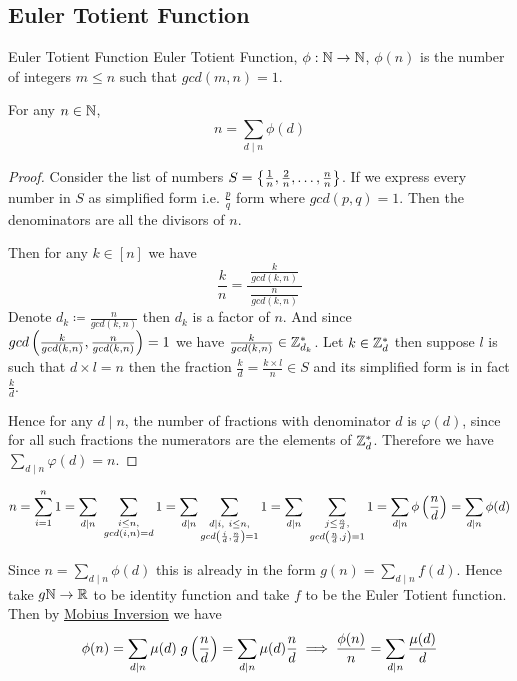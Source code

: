 \documentclass[twoside]{article}
\begin{document}
\subsection{Euler Totient Function}
\begin{Definition}{Euler Totient Function}{}
	Euler Totient Function, $\phi:\mathbb{N}\to\mathbb{N}$, $\phi(n)$ is the number of integers $m\leq n$ such that $gcd(m,n)=1$.
\end{Definition}
\begin{lemma}{}{}
	For any $n\in \mathbb{N}$, $$n=\sum_{d\mid n}\phi(d)$$
\end{lemma}
\begin{proof}
	Consider the list of numbers $S=\left\{\frac1n,\frac2n,\dots,\frac{n}{n}\right\}$. If we express every number in $S$ as simplified form i.e. $\frac{p}{q}$ form where $gcd(p,q)=1$. Then the denominators are all the divisors of $n$. 
	
	
	Then for any $k\in[n]$ we have $$\frac{k}{n}=\frac{\ \frac{k}{gcd(k,n)}\ }{\ \frac{n}{gcd(k,n)}\ }$$Denote $d_k\coloneqq\frac{n}{gcd(k,n)}$ then $d_k$ is a factor of $n$. And since $gcd\left( \frac{k}{gcd(k,n)}, \frac{n}{gcd(k,n)} \right)=1$ we have $\frac{k}{gcd(k,n)}\in \mathbb{Z}_{d_k}^*$. Let $k\in\mathbb{Z}_{d}^*$ then suppose $l$ is such that $d\times l=n$ then the fraction $\frac{k}{d}=\frac{k\times l}{n}\in S$ and its simplified form is in fact $\frac{k}{d}$.
	
	Hence for any $d\mid n$, the number of fractions with denominator $d$ is $\varphi(d)$, since for all such fractions the numerators are the elements of $\mathbb{Z}_{d}^*$. Therefore we have $\sum\limits_{d\mid n} \varphi(d)=n$.
	
\end{proof}
\begin{alternate-proof}
	$$n  = \sum_{i=1}^n 1 = \sum_{d\mid n}\ \sum_{\substack{i\leq n,\\ gcd(i,n)=d}}1=\sum_{d\mid n} \sum_{\substack{d\mid i,\ i\leq n,\\ gcd\lt(\frac{i}d,\frac{n}d\rt)=1}}1=\sum_{d\mid n}\ \sum_{\substack{j\leq \frac{n}d,\\ gcd\lt(\frac{n}d,j\rt)=1}}1= \sum_{d\mid n}\phi\lt(\frac{n}d\rt)=\sum_{d\mid n}\phi(d)$$
\end{alternate-proof}

Since $n=\sum\limits_{d\mid n}\phi(d)$ this is already in the form $g(n)=\sum\limits_{d\mid n}f(d)$. Hence take $g\mathbb{N}\to \mathbb{R}$ to be identity function and take $f$ to be the Euler Totient function. Then by \hyperref[th:mi]{Mobius Inversion} we have $$\phi(n)=\sum_{d\mid n}\mu(d)\; g\left(\frac{n}d\right)=\sum_{d\mid n}\mu(d)\frac{n}d\implies \frac{\phi(n)}{n}=\sum_{d\mid n}\frac{\mu(d)}{d}$$
\end{document}
